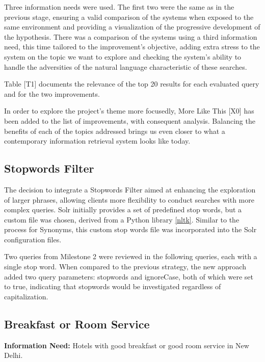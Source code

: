 \documentclass[sigconf]{acmart}
\begin{document}
Three information needs were used. The first two were the same as in the previous stage, ensuring a valid comparison of the systems when exposed to the same environment and providing a visualization of the progressive development of the hypothesis. There was a comparison of the systems using a third information need, this time tailored to the improvement's objective, adding extra stress to the system on the topic we want to explore and checking the system's ability to handle the adversities of the natural language characteristic of these searches.

Table [T1] documents the relevance of the top 20 results for each evaluated query and for the two improvements.

In order to explore the project's theme more focusedly, More Like This [X0] has been added to the list of improvements, with consequent analysis. Balancing the benefits of each of the topics addressed brings us even closer to what a contemporary information retrieval system looks like today.

\subsection{Stopwords Filter}

The decision to integrate a Stopwords Filter aimed at enhancing the exploration of larger phrases, allowing clients more flexibility to conduct searches with more complex queries. Solr initially provides a set of predefined stop words, but a custom file was chosen, derived from a Python library \ref{nltk}. Similar to the process for Synonyms, this custom stop words file was incorporated into the Solr configuration files.

Two queries from Milestone 2 were reviewed in the following queries, each with a single stop word. When compared to the previous strategy, the new approach added two query parameters: stopwords and ignoreCase, both of which were set to true, indicating that stopwords would be investigated regardless of capitalization.

\renewcommand{\thesubsection}{\Alph{subsection}}

\setcounter{subsection}{0}
\subsection{Breakfast or Room Service}

\textbf{Information Need:} Hotels with good breakfast or good room service in New Delhi.
\end{document}
